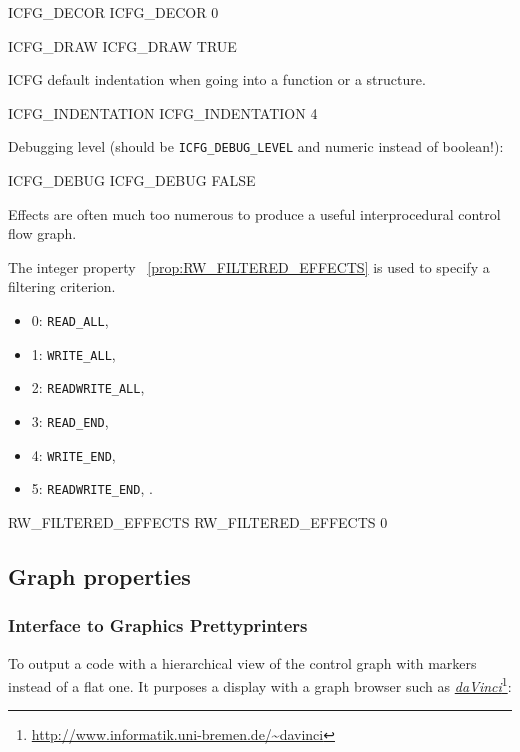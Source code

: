 \documentclass[a4paper]{report}
\newcommand{\PdaVinci}{\LINK{\emph{daVinci}}{http://www.informatik.uni-bremen.de/~davinci}}
\newcommand{\PipsPropRef}[1]{\texttt{\detokenize{#1}}~\ref{prop:#1}}
\newcommand{\LINK}[2]{\href{#2}{#1}\footnote{\url{#2}}\xspace}
\begin{document}
\begin{PipsProp}{ICFG_DECOR}
ICFG_DECOR 0
\end{PipsProp}

\begin{PipsProp}{ICFG_DRAW}
ICFG_DRAW TRUE
\end{PipsProp}

ICFG default indentation when going into a function or a structure.
\begin{PipsProp}{ICFG_INDENTATION}
ICFG_INDENTATION 4
\end{PipsProp}

Debugging level (should be \verb+ICFG_DEBUG_LEVEL+ and numeric instead
of boolean!):

\begin{PipsProp}{ICFG_DEBUG}
ICFG_DEBUG FALSE
\end{PipsProp}

Effects are often much too numerous to produce a useful interprocedural
control flow graph.

The integer property \PipsPropRef{RW_FILTERED_EFFECTS} is used to specify a
filtering criterion.
\begin{itemize}
\item 0: \verb/READ_ALL/,
\item 1: \verb/WRITE_ALL/,
\item 2: \verb/READWRITE_ALL/,
\item 3: \verb/READ_END/,
\item 4: \verb/WRITE_END/,
\item 5: \verb/READWRITE_END/, .
\end{itemize}

\begin{PipsProp}{RW_FILTERED_EFFECTS}
RW_FILTERED_EFFECTS 0
\end{PipsProp}

\subsection{Graph properties}


\subsubsection{Interface to Graphics Prettyprinters}

To output a code with a hierarchical view of the control graph with
markers instead of a flat one. It purposes a display with a graph
browser such as \PdaVinci{}:
\end{document}
